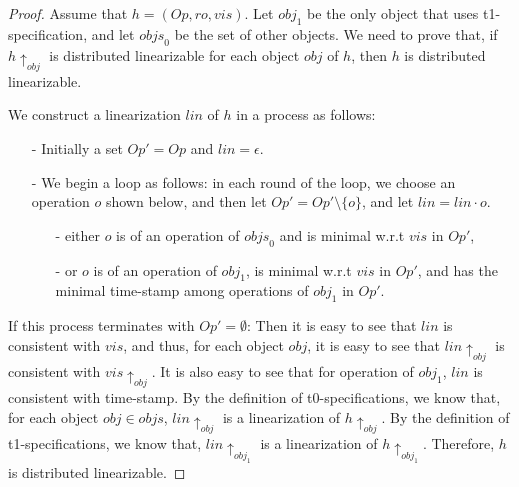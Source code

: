 {\composingTZeroAndOneTOne*
\begin {proof}
Assume that $h = (\mathit{Op},\mathit{ro},\mathit{vis})$. Let $\mathit{obj}_1$ be the only object that uses t1-specification, and let $\mathit{objs}_0$ be the set of other objects. We need to prove that, if $h \uparrow_{\mathit{obj}}$ is distributed linearizable for each object $\mathit{obj}$ of $h$, then $h$ is distributed linearizable.

We construct a linearization $\mathit{lin}$ of $h$ in a process as follows:

\begin{itemize}
\setlength{\itemsep}{0.5pt}
\item[-] Initially a set $\mathit{Op}' = \mathit{Op}$ and $\mathit{lin} = \epsilon$.

\item[-] We begin a loop as follows: in each round of the loop, we choose an operation $o$ shown below, and then let $\mathit{Op}' = \mathit{Op}' \setminus \{ o \}$, and let $\mathit{lin} = \mathit{lin} \cdot o$.

    \begin{itemize}
    \setlength{\itemsep}{0.5pt}
    \item[-] either $o$ is of an operation of $\mathit{objs}_0$ and is minimal w.r.t $\mathit{vis}$ in $\mathit{Op}'$,

    \item[-] or $o$ is of an operation of $\mathit{obj}_1$, is minimal w.r.t $\mathit{vis}$ in $\mathit{Op}'$, and has the minimal time-stamp among operations of $\mathit{obj}_1$ in $\mathit{Op}'$.
    \end{itemize}
\end{itemize}

If this process terminates with $\mathit{Op}' = \emptyset$: Then it is easy to see that $\mathit{lin}$ is consistent with $\mathit{vis}$, and thus, for each object $\mathit{obj}$, it is easy to see that $\mathit{lin} \uparrow_{\mathit{obj}}$ is consistent with $\mathit{vis} \uparrow_{\mathit{obj}}$. It is also easy to see that for operation of $\mathit{obj}_1$, $\mathit{lin}$ is consistent with time-stamp. By the definition of t0-specifications, we know that, for each object $\mathit{obj} \in \mathit{objs}$, $\mathit{lin} \uparrow_{\mathit{obj}}$ is a linearization of $h \uparrow_{\mathit{obj}}$. By the definition of t1-specifications, we know that, $\mathit{lin} \uparrow_{\mathit{obj}_1}$ is a linearization of $h \uparrow_{\mathit{obj}_1}$. Therefore, $h$ is distributed linearizable.


\end{proof}}
